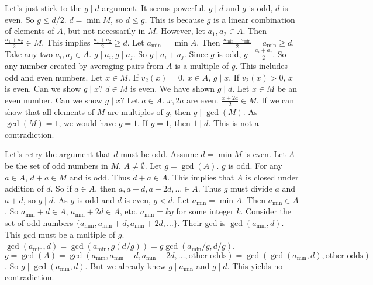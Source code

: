 \documentclass[12pt,a4paper]{article}
\theoremstyle{definition}
\begin{document}
    Let's just stick to the $g \mid d$ argument. It seems powerful.
    $g \mid d$ and $g$ is odd, $d$ is even. So $g \leq d/2$.
    $d = \min M$, so $d \leq g$. This is because $g$ is a linear combination of elements of $A$, but not necessarily in $M$.
    However, let $a_1, a_2 \in A$. Then $\frac{a_1+a_2}{2} \in M$.
    This implies $\frac{a_1+a_2}{2} \geq d$.
    Let $a_{\min}=\min A$. Then $\frac{a_{\min}+a_{\min}}{2}=a_{\min} \geq d$.
    Take any two $a_i, a_j \in A$. $g \mid a_i, g \mid a_j$. So $g \mid a_i+a_j$. Since $g$ is odd, $g \mid \frac{a_i+a_j}{2}$.
    So any number created by averaging pairs from $A$ is a multiple of $g$.
    This includes odd and even numbers.
    Let $x \in M$. If $v_2(x)=0$, $x \in A$, $g \mid x$.
    If $v_2(x)>0$, $x$ is even. Can we show $g \mid x$?
    $d \in M$ is even. We have shown $g \mid d$.
    Let $x \in M$ be an even number. Can we show $g \mid x$?
    Let $a \in A$. $x, 2a$ are even. $\frac{x+2a}{2} \in M$.
    If we can show that all elements of $M$ are multiples of $g$, then $g \mid \gcd(M)$.
    As $\gcd(M)=1$, we would have $g=1$.
    If $g=1$, then $1 \mid d$. This is not a contradiction.

    Let's retry the argument that $d$ must be odd.
    Assume $d=\min M$ is even. Let $A$ be the set of odd numbers in $M$. $A \neq \emptyset$. Let $g=\gcd(A)$. $g$ is odd.
    For any $a \in A$, $d+a \in M$ and is odd. Thus $d+a \in A$.
    This implies that $A$ is closed under addition of $d$.
    So if $a \in A$, then $a, a+d, a+2d, \ldots \in A$.
    Thus $g$ must divide $a$ and $a+d$, so $g \mid d$. As $g$ is odd and $d$ is even, $g < d$.
    Let $a_{\min} = \min A$. Then $a_{\min} \in A$. So $a_{\min}+d \in A$, $a_{\min}+2d \in A$, etc.
    $a_{\min} = k g$ for some integer $k$.
    Consider the set of odd numbers $\{a_{\min}, a_{\min}+d, a_{\min}+2d, \ldots\}$. Their gcd is $\gcd(a_{\min}, d)$.
    This gcd must be a multiple of $g$. $\gcd(a_{\min}, d) = \gcd(a_{\min}, g(d/g)) = g \gcd(a_{\min}/g, d/g)$.
    $g = \gcd(A) = \gcd(a_{\min}, a_{\min}+d, a_{\min}+2d, \ldots, \text{other odds}) = \gcd(\gcd(a_{\min},d), \text{other odds})$.
    So $g \mid \gcd(a_{\min},d)$. But we already knew $g \mid a_{\min}$ and $g \mid d$.
    This yields no contradiction.
\end{document}
